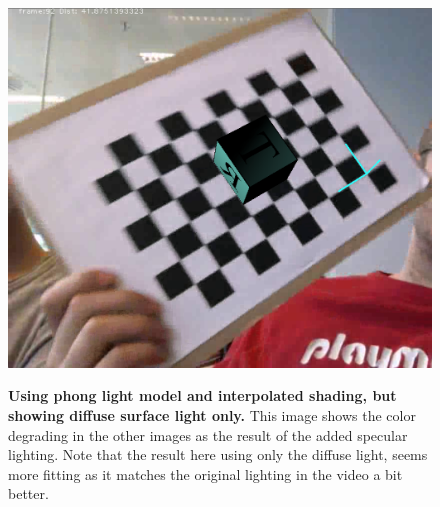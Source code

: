 \begin{figure}[!htbp]
    \includegraphics{pics/phongDiffuseOnly.png}
    \label{fig:EphongDiffuseOnly}
    \caption{\textbf{Using phong light model and interpolated shading, but showing diffuse surface light only.} 
    This image shows the color degrading in the other images as the result of the added specular lighting. Note that the result here using only the diffuse light, seems more fitting as it matches the original lighting in the video a bit better. }
\end{figure}
